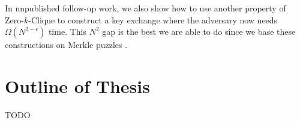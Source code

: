In unpublished follow-up work, we also show how to use another property of Zero-$k$-Clique to construct a key exchange where the adversary now needs $\Omega(N^{2 - \epsilon})$ time. This $N^2$ gap is the best we are able to do since we base these constructions on Merkle puzzles \cite{optimalMerklePuzzles}.

\section{Outline of Thesis}
TODO
